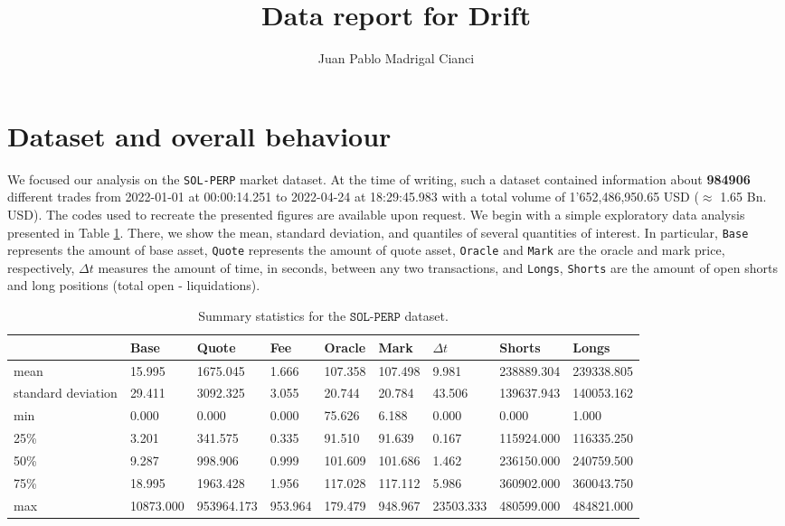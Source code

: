 \documentclass[]{scrartcl}
\title{Data report  for Drift}
\author{Juan Pablo Madrigal Cianci}
\begin{document}
	\maketitle
	
	\begin{abstract}
	\end{abstract}
	\section{Dataset and overall behaviour}
	
	We focused our analysis on the \texttt{SOL-PERP} market dataset. At the time of writing, such a dataset contained information about  \textbf{984906} different trades from 2022-01-01 at 00:00:14.251 to 2022-04-24 at 18:29:45.983 with a total volume of 1'652,486,950.65 USD ($\approx$ 1.65 Bn. USD). The codes used to recreate the presented figures are available upon request.  We begin with a simple exploratory data analysis presented in Table \ref{tab:1}. There, we show the mean, standard deviation, and quantiles of several quantities of interest. In particular, \texttt{Base} represents the amount of base asset, \texttt{Quote} represents the amount of quote asset, \texttt{Oracle} and \texttt{Mark} are the oracle and mark price, respectively, $\Delta t$ measures the amount of time, in seconds, between any two transactions, and \texttt{Longs}, \texttt{Shorts} are the amount of open shorts and long positions (total open - liquidations). 
	
	\begin{table}[H]\scriptsize{
			\begin{tabular}{@{}lllllllll@{}}
				\toprule
				& Base   & Quote  & Fee        & Oracle  & Mark      & $\Delta t$         & Shorts & Longs  \\ \midrule
				mean & 15.995 & 1675.045 & 1.666 & 107.358 & 107.498 & 9.981  & 238889.304 & 239338.805  \\
				standard deviation  & 29.411 & 3092.325 & 3.055 & 20.744  & 20.784  & 43.506 & 139637.943 & 140053.162 \\
				min  & 0.000  & 0.000    & 0.000 & 75.626  & 6.188   & 0.000  & 0.000      & 1.000      \\
				25\% & 3.201  & 341.575  & 0.335 & 91.510  & 91.639  & 0.167  & 115924.000 & 116335.250  \\
				50\% & 9.287  & 998.906  & 0.999 & 101.609 & 101.686 & 1.462  & 236150.000 & 240759.500  \\
				75\% & 18.995 & 1963.428 & 1.956 & 117.028 & 117.112 & 5.986  & 360902.000 & 360043.750  \\
				max & 10873.000       & 953964.173       & 953.964 & 179.479     & 948.967   & 23503.333  & 480599.000  & 484821.000 
		\end{tabular}}
		\caption{Summary statistics for the $\texttt{SOL-PERP}$ dataset. \label{tab:1}}
	\end{table}
	
\end{document}
